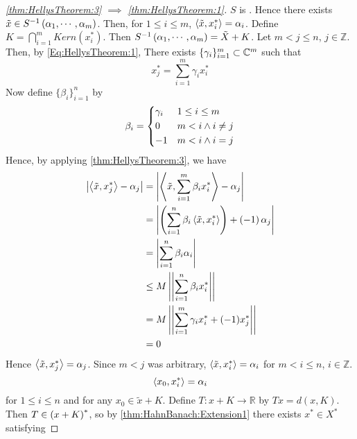 \begin{thm}
\begin{proof}[\ref{thm:HellysTheorem:3} $\implies$ \ref{thm:HellysTheorem:1}]
        $S$ is \Surjective. 
        Hence there exists  $\tilde{x} \in S^{-1}\left( \alpha_1, \cdots, \alpha_m\right)$. 
        Then, for $1 \leq i \leq m$, $\left\langle \tilde{x}, x_i^* \right\rangle = \alpha_i$. 
        Define $K=\bigcap\limits_{i=1}^{m}Kern(x_i^*)$. 
        Then $S^{-1}\left( \alpha_1, \cdots, \alpha_m\right) = \tilde{X}+K$. 
        Let $m<j \leq n$, $j \in \mathbb{Z}$. Then, by 
        \ref{Eq:HellysTheorem:1}, 
        There exists $\{\gamma_i\}_{i=1}^m \subset \mathbb{C}^m$ such that 
        \begin{equation*}
        x_j^*= \sum_{i=1}^m \gamma_i x_i^*
        \end{equation*}
        Now define $\{\beta_i\}_{i=1}^n $ by 
        \begin{equation}
        \beta_i = \begin{dcases}
        \gamma_i & 1 \leq i \leq m \\
        0 & m < i \wedge i \neq j \\
        -1 & m < i \wedge i = j
        \end{dcases}
        \end{equation}
        Hence, 
        by applying \ref{thm:HellysTheorem:3}, 
        we have 
        \begin{align*}
        \left| \left\langle \tilde{x}, x_j^* \right\rangle-\alpha_j \right| 
        & = \left| \left\langle \tilde{x}, \sum\limits_{i=1}^m \beta_ix_i^* \right\rangle-\alpha_j \right|\\
        & = \left| \left( \sum_{i=1}^n \beta_i \left\langle \tilde{x}, x_i^* \right\rangle\right) + \left( -1\right) \alpha_j \right|\\
        & = \left| \sum\limits_{i=1}^n \beta_i\alpha_i \right| \\ 
        & \leq M \left|\left| \sum\limits_{i=1}^n \beta_i x_i^* \right|\right|\\
        & = M \left|\left| \sum\limits_{i=1}^m \gamma_ix_i^* + (-1) x_j^* \right|\right|\\
        & = 0
        \end{align*}
        Hence $\left\langle \tilde{x}, x_j^* \right\rangle = \alpha_j$. 
        Since $m < j$ was arbitrary, 
        $\left\langle \tilde{x}, x_i^* \right\rangle = \alpha_i$ for 
        $m < i \leq n$, $i \in \mathbb{Z}$. 
        \begin{equation*}
        \label{eq:HellysTheorem:2}
        \left\langle x_0, x_i^* \right\rangle = \alpha_i 
        \end{equation*}
        for $1 \leq i \leq n$
        and for any $x_0 \in \tilde{x}+K$. 
        Define $T:x+K \to \mathbb{R}$ by 
        $Tx=d(x, K)$. 
        Then $T \in \left( x+K\right)^*$, so by 
        \ref{thm:HahnBanach:Extension1}
        there exists $x^* \in X^*$ satisfying

\end{proof}
\end{thm}
